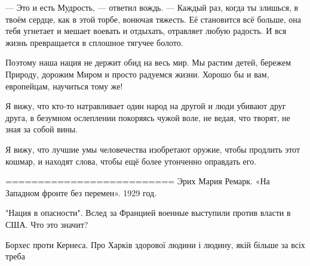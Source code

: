 — Это и есть Мудрость, — ответил вождь. — Каждый раз, когда ты злишься, в твоём
сердце, как в этой торбе, вонючая тяжесть. Её становится всё больше, она тебя
угнетает и мешает воевать и отдыхать, отравляет любую радость. И вся жизнь
превращается в сплошное тягучее болото.

Поэтому наша нация не держит обид на весь мир. Мы растим детей, бережем
Природу, дорожим Миром и просто радуемся жизни. Хорошо бы и вам, европейцам,
научиться тому же!

Я вижу, что кто-то натравливает один народ на другой и люди убивают друг друга, в безумном ослеплении покоряясь чужой воле, не ведая, что творят, не зная за собой вины.

Я вижу, что лучшие умы человечества изобретают оружие, чтобы продлить этот кошмар, и находят слова, чтобы ещё более утонченно оправдать его.

==========================
Эрих Мария Ремарк. «На Западном фронте без перемен». 1929 год.

"Нация в опасности". Вслед за Францией военные выступили против власти в США. Что это значит?

Борхес проти Кернеса. Про Харків здорової людини і людину, якій більше за всіх треба

